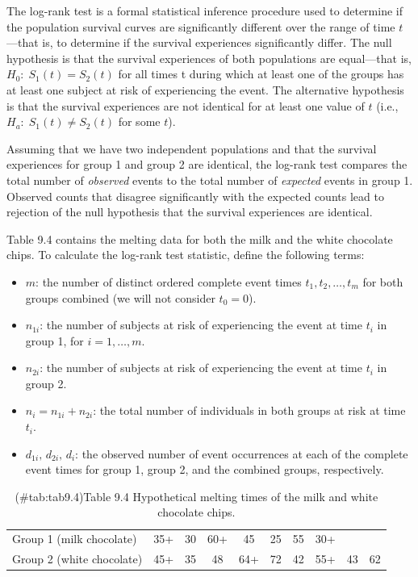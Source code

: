 \documentclass[
]{book}
\providecommand{\tightlist}{%
  \setlength{\itemsep}{0pt}\setlength{\parskip}{0pt}}
\begin{document}
The log-rank test is a formal statistical inference procedure used to determine if the population survival curves are significantly different over the range of time \(t\)---that is, to determine if the survival experiences significantly differ. The null hypothesis is that the survival experiences of both populations are equal---that is, \(H_0:\;S_1(t) = S_2(t)\) for all times t during which at least one of the groups has at least one subject at risk of
experiencing the event. The alternative hypothesis is that the survival experiences are not identical for at least one value of \(t\) (i.e., \(H_a:\;S_1(t)\neq S_2(t)\) for some \(t\)).

Assuming that we have two independent populations and that the survival experiences for group 1 and group 2 are identical, the log-rank test compares the total number of \emph{observed} events to the total number of \emph{expected} events in group 1. Observed counts that disagree significantly with the expected counts lead to rejection of the null hypothesis that the survival experiences are identical.

Table 9.4 contains the melting data for both the milk and the white chocolate chips. To calculate the log-rank test statistic, define the following terms:

\begin{itemize}
\tightlist
\item
  \(m\): the number of distinct ordered complete event times \(t_1, t_2, \dots, t_m\) for both groups combined (we will not consider \(t_0 = 0\)).
\item
  \(n_{1i}\): the number of subjects at risk of experiencing the event at time \(t_i\) in group 1, for \(i = 1,\dots,m\).\\
\item
  \(n_{2i}\): the number of subjects at risk of experiencing the event at time \(t_i\) in group 2.\\
\item
  \(n_i = n_{1i} + n_{2i}\): the total number of individuals in both groups at risk at time \(t_i\).\\
\item
  \(d_{1i},\,d_{2i},\,d_i\): the observed number of event occurrences at each of the complete event times for group 1, group 2, and the combined groups, respectively.
\end{itemize}

\begin{table}[!h]
\centering
\caption{(\#tab:tab9.4)Table 9.4 Hypothetical melting times of the milk and white chocolate chips.}
\centering
\begin{tabular}[t]{llcccccccc}
\toprule
  &  &  &  &  &  &  &  &  & \\
\midrule
Group 1 (milk chocolate) & 35+ & 30 & 60+ & 45 & 25 & 55 & 30+ &  & \\
Group 2 (white chocolate) & 45+ & 35 & 48 & 64+ & 72 & 42 & 55+ & 43 & 62\\
\bottomrule
\end{tabular}
\end{table}
\end{document}
